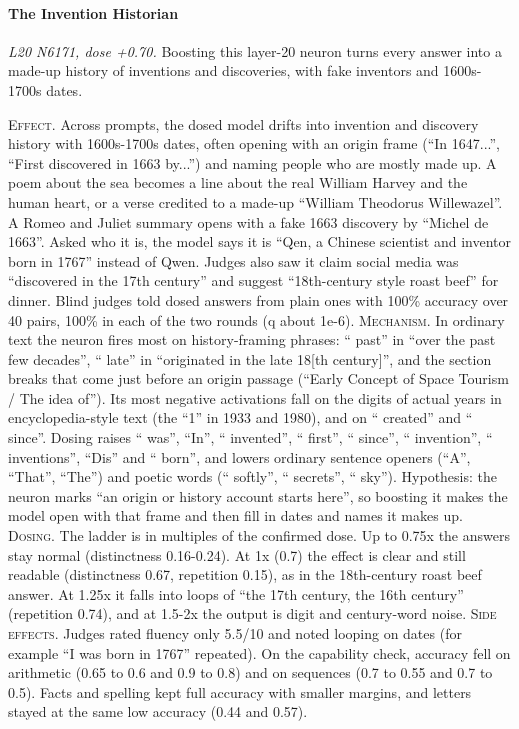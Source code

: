 \paragraph{The Invention Historian} \textit{L20 N6171, dose +0.70.} Boosting this layer-20 neuron turns every answer into a made-up history of inventions and discoveries, with fake inventors and 1600s-1700s dates.

\noindent\textsc{Effect.} Across prompts, the dosed model drifts into invention and discovery history with 1600s-1700s dates, often opening with an origin frame (“In 1647...”, “First discovered in 1663 by...”) and naming people who are mostly made up. A poem about the sea becomes a line about the real William Harvey and the human heart, or a verse credited to a made-up “William Theodorus Willewazel”. A Romeo and Juliet summary opens with a fake 1663 discovery by “Michel de 1663”. Asked who it is, the model says it is “Qen, a Chinese scientist and inventor born in 1767” instead of Qwen. Judges also saw it claim social media was “discovered in the 17th century” and suggest “18th-century style roast beef” for dinner. Blind judges told dosed answers from plain ones with 100\% accuracy over 40 pairs, 100\% in each of the two rounds (q about 1e-6). \textsc{Mechanism.} In ordinary text the neuron fires most on history-framing phrases: “ past” in “over the past few decades”, “ late” in “originated in the late 18[th century]”, and the section breaks that come just before an origin passage (“Early Concept of Space Tourism / The idea of”). Its most negative activations fall on the digits of actual years in encyclopedia-style text (the “1” in 1933 and 1980), and on “ created” and “ since”. Dosing raises “ was”, “In”, “ invented”, “ first”, “ since”, “ invention”, “ inventions”, “Dis” and “ born”, and lowers ordinary sentence openers (“A”, “That”, “The”) and poetic words (“ softly”, “ secrets”, “ sky”). Hypothesis: the neuron marks “an origin or history account starts here”, so boosting it makes the model open with that frame and then fill in dates and names it makes up. \textsc{Dosing.} The ladder is in multiples of the confirmed dose. Up to 0.75x the answers stay normal (distinctness 0.16-0.24). At 1x (0.7) the effect is clear and still readable (distinctness 0.67, repetition 0.15), as in the 18th-century roast beef answer. At 1.25x it falls into loops of “the 17th century, the 16th century” (repetition 0.74), and at 1.5-2x the output is digit and century-word noise. \textsc{Side effects.} Judges rated fluency only 5.5/10 and noted looping on dates (for example “I was born in 1767” repeated). On the capability check, accuracy fell on arithmetic (0.65 to 0.6 and 0.9 to 0.8) and on sequences (0.7 to 0.55 and 0.7 to 0.5). Facts and spelling kept full accuracy with smaller margins, and letters stayed at the same low accuracy (0.44 and 0.57).

